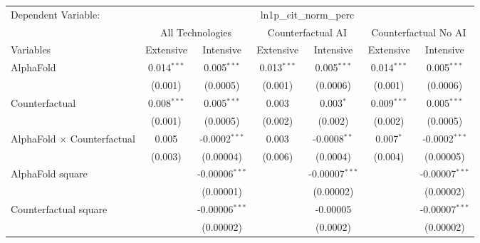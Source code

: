 \begingroup
\centering
\begin{tabular}{lcccccc}
   \tabularnewline \midrule \midrule
   Dependent Variable: & \multicolumn{6}{c}{ln1p\_cit\_norm\_perc}\\
 & \multicolumn{2}{c}{All Technologies} & \multicolumn{2}{c}{Counterfactual AI} & \multicolumn{2}{c}{Counterfactual No AI} \\
\cmidrule(lr){1-1}\cmidrule(lr){2-3} \cmidrule(lr){4-5} \cmidrule(lr){6-7}
Variables & \multicolumn{1}{c}{Extensive} & \multicolumn{1}{c}{Intensive} & \multicolumn{1}{c}{Extensive} & \multicolumn{1}{c}{Intensive} & \multicolumn{1}{c}{Extensive} & \multicolumn{1}{c}{Intensive} \\
\cmidrule(lr){1-1}\cmidrule(lr){2-2} \cmidrule(lr){3-3} \cmidrule(lr){4-4} \cmidrule(lr){5-5} \cmidrule(lr){6-6} \cmidrule(lr){7-7}
   AlphaFold                          & 0.014$^{***}$ & 0.005$^{***}$      & 0.013$^{***}$ & 0.005$^{***}$    & 0.014$^{***}$ & 0.005$^{***}$\\   
                                      & (0.001)       & (0.0005)           & (0.001)       & (0.0006)         & (0.001)       & (0.0006)\\   
   Counterfactual                     & 0.008$^{***}$ & 0.005$^{***}$      & 0.003         & 0.003$^{*}$      & 0.009$^{***}$ & 0.005$^{***}$\\   
                                      & (0.001)       & (0.0005)           & (0.002)       & (0.002)          & (0.002)       & (0.0005)\\   
   AlphaFold $\times$ Counterfactual  & 0.005         & -0.0002$^{***}$    & 0.003         & -0.0008$^{**}$   & 0.007$^{*}$   & -0.0002$^{***}$\\   
                                      & (0.003)       & (0.00004)          & (0.006)       & (0.0004)         & (0.004)       & (0.00005)\\   
   AlphaFold square                   &               & -0.00006$^{***}$   &               & -0.00007$^{***}$ &               & -0.00007$^{***}$\\   
                                      &               & (0.00001)          &               & (0.00002)        &               & (0.00002)\\   
   Counterfactual square              &               & -0.00006$^{***}$   &               & -0.00005         &               & -0.00007$^{***}$\\   
                                      &               & (0.00002)          &               & (0.0002)         &               & (0.00002)\\   

\end{tabular}
